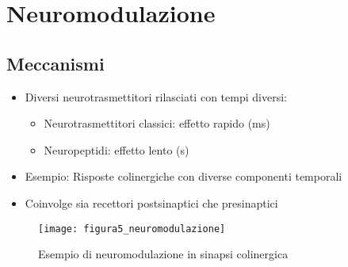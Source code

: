 \documentclass{article}
\begin{document}
\section{Neuromodulazione}
\subsection{Meccanismi}
\begin{itemize}
\item Diversi neurotrasmettitori rilasciati con tempi diversi:
  \begin{itemize}
  \item Neurotrasmettitori classici: effetto rapido (ms)
  \item Neuropeptidi: effetto lento (s)
  \end{itemize}
\item Esempio: Risposte colinergiche con diverse componenti temporali
\item Coinvolge sia recettori postsinaptici che presinaptici
\end{itemize}

\begin{figure}[h]
\centering
\texttt{[image: figura5\_neuromodulazione]}
\caption{Esempio di neuromodulazione in sinapsi colinergica}
\label{fig:neuromodulazione}
\end{figure}
\end{document}
